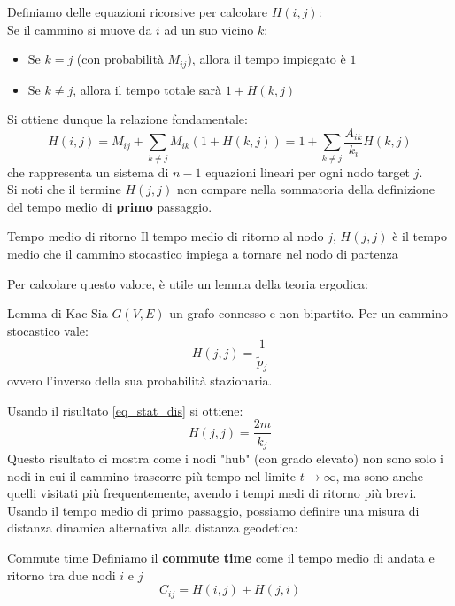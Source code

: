 Definiamo delle equazioni ricorsive per calcolare $H(i,j)$:\\

Se il cammino si muove da $i$ ad un suo vicino $k$:
\begin{itemize}
    \item Se $k=j$ (con probabilità $M_{ij}$), allora il tempo impiegato è $1$
    \item Se $k \not= j$, allora il tempo totale sarà $1+H(k,j)$
\end{itemize}

Si ottiene dunque la relazione fondamentale:
\begin{equation}
    H(i,j)=M_{ij}+\sum_{k \not = j}^{}M_{ik}(1+H(k,j))=1+\sum_{k \not = j}^{}\frac{A_{ik}}{k_i}H(k,j)
\end{equation}
che rappresenta un sistema di $n-1$ equazioni lineari per ogni nodo target $j$.\\

Si noti che il termine $H(j,j)$ non compare nella sommatoria della definizione del tempo medio di \textbf{primo} passaggio.

\begin{boxb}{Tempo medio di ritorno}
Il tempo medio di ritorno al nodo $j$, $H(j,j)$ è il tempo medio che il cammino stocastico impiega a tornare nel nodo di partenza
\end{boxb}
Per calcolare questo valore, è utile un lemma della teoria ergodica:
\begin{boxl}{Lemma di Kac}
Sia $G(V,E)$ un grafo connesso e non bipartito. Per un cammino stocastico vale:
\begin{equation}
    H(j,j)=\frac{1}{\tilde{p}_j}
\end{equation}
ovvero l'inverso della sua probabilità stazionaria.
\end{boxl}
Usando il risultato \ref{eq_stat_dis} si ottiene:
\begin{equation}
    \boxed{H(j,j)=\frac{2m}{k_j}}
\end{equation}
Questo risultato ci mostra come i nodi "hub" (con grado elevato) non sono solo i nodi in cui il cammino trascorre più tempo nel limite $t \to \infty$, ma sono anche quelli visitati più frequentemente, avendo i tempi medi di ritorno più brevi.\\

Usando il tempo medio di primo passaggio, possiamo definire una misura di distanza dinamica alternativa alla distanza geodetica:
\begin{boxb}{Commute time}
    Definiamo il \textbf{commute time} come il tempo medio di andata e ritorno tra due nodi $i$ e $j$
\begin{equation}
    C_{ij}=H(i,j)+H(j,i)
\end{equation}
\end{boxb}

